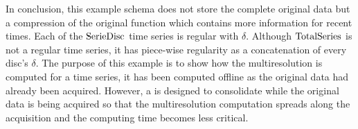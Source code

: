 In conclusion, this  example schema does not store the
complete original data but a compression of the original function
which contains more information for recent times.  Each of the
$\operatorname{SerieDisc}$ time series is regular with $\delta$. Although
$\operatorname{TotalSeries}$ is not a regular time series, it has piece-wise
regularity as a concatenation of every disc's $\delta$.  The purpose
of this example is to show how the multiresolution is computed for a
time series, it has been computed offline as the original data had
already been acquired. However, a  is designed to
consolidate while the original data is being acquired so that the
multiresolution computation spreads along the acquisition and the
computing time becomes less critical.







